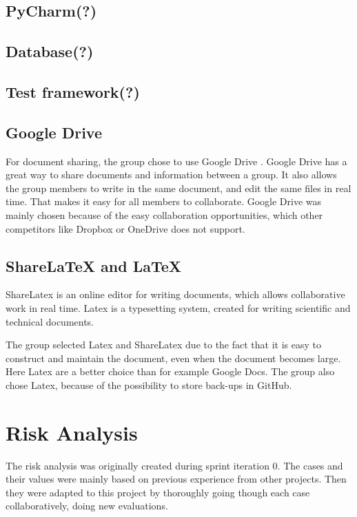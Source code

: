 \subsection{PyCharm(?)}
\subsection{Database(?)}
\subsection{Test framework(?)}

\subsection{Google Drive}
For document sharing, the group chose to use Google Drive \cite{GoogleDrive}. Google Drive has a great way to share documents and information between a group. It also allows the group members to write in the same document, and edit the same files in real time. That makes it easy for all members to collaborate. Google Drive was mainly chosen because of the easy collaboration opportunities, which other competitors like Dropbox or OneDrive does not support. 

\subsection{ShareLaTeX and LaTeX}
ShareLatex \cite{ShareLatex} is an online editor for writing documents, which allows collaborative work in real time. Latex is a typesetting system, created for writing scientific and technical documents. 

The group selected Latex and ShareLatex due to the fact that it is easy to construct and maintain the document, even when the document becomes large. Here Latex are a better choice than for example Google Docs. The group also chose Latex, because of the possibility to store back-ups in GitHub.

\section{Risk Analysis} \label{riskAnalysis}

The risk analysis was originally created during sprint iteration 0. The cases and their values were mainly based on previous experience from other projects. Then they were adapted to this project by thoroughly going though each case collaboratively, doing new evaluations.

